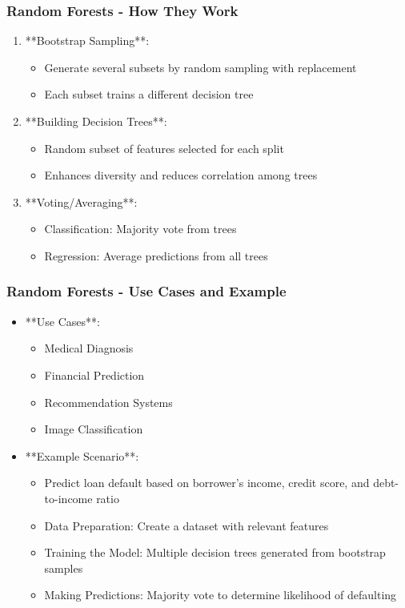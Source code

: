 \documentclass[aspectratio=169]{beamer}
\begin{document}
\begin{frame}[fragile]
    \frametitle{Random Forests - How They Work}
    \begin{enumerate}
        \item **Bootstrap Sampling**:
        \begin{itemize}
            \item Generate several subsets by random sampling with replacement
            \item Each subset trains a different decision tree
        \end{itemize}
        
        \item **Building Decision Trees**:
        \begin{itemize}
            \item Random subset of features selected for each split
            \item Enhances diversity and reduces correlation among trees
        \end{itemize}
        
        \item **Voting/Averaging**:
        \begin{itemize}
            \item Classification: Majority vote from trees
            \item Regression: Average predictions from all trees
        \end{itemize}
    \end{enumerate}
\end{frame}

\begin{frame}[fragile]
    \frametitle{Random Forests - Use Cases and Example}
    \begin{itemize}
        \item **Use Cases**:
        \begin{itemize}
            \item Medical Diagnosis
            \item Financial Prediction
            \item Recommendation Systems
            \item Image Classification
        \end{itemize}
        
        \item **Example Scenario**:
        \begin{itemize}
            \item Predict loan default based on borrower’s income, credit score, and debt-to-income ratio
            \item Data Preparation: Create a dataset with relevant features
            \item Training the Model: Multiple decision trees generated from bootstrap samples
            \item Making Predictions: Majority vote to determine likelihood of defaulting
        \end{itemize}
    \end{itemize}
\end{frame}
\end{document}
